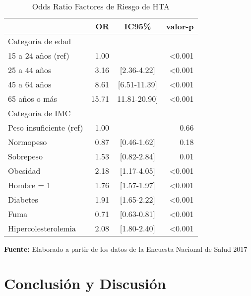 \documentclass{aa}
\begin{document}
\begin{table}[b]
\caption{\small Odds Ratio Factores de Riesgo de HTA}
    \centering
    \small
\begin{tabular}{lrcr}
\toprule
  & OR & IC95\% & valor-p\\
\midrule
Categoría de edad\\
\-\hspace{5mm} \tiny  15 a 24 años (ref) & 1.00 & & <0.001\\
\-\hspace{5mm} \tiny  25 a 44 años & 3.16 & [2.36-4.22] & <0.001\\
\-\hspace{5mm} \tiny  45 a 64 años & 8.61 & [6.51-11.39] & <0.001\\
\-\hspace{5mm} \tiny  65 años o más & 15.71 & 11.81-20.90] & <0.001\\
\addlinespace
Categoría de IMC\\
\-\hspace{5mm} \tiny  Peso insuficiente (ref) & 1.00 &  & 0.66\\
\-\hspace{5mm} \tiny  Normopeso & 0.87 & [0.46-1.62] & 0.18\\
\-\hspace{5mm} \tiny  Sobrepeso & 1.53 & [0.82-2.84] & 0.01\\
\-\hspace{5mm} \tiny  Obesidad & 2.18 & [1.17-4.05] & <0.001\\
\addlinespace
Hombre = 1 & 1.76 & [1.57-1.97] & <0.001\\
Diabetes & 1.91 & [1.65-2.22] & <0.001\\
\addlinespace
Fuma & 0.71 & [0.63-0.81] & <0.001\\
\addlinespace
Hipercolesterolemia & 2.08 & [1.80-2.40] & <0.001\\
\bottomrule
\end{tabular}
    \vspace{1ex}
    
    {\raggedright \small \textbf{Fuente:} Elaborado a partir de los datos de la Encuesta Nacional de Salud 2017 \par}
\end{table}


\section{Conclusión y Discusión}
\end{document}
